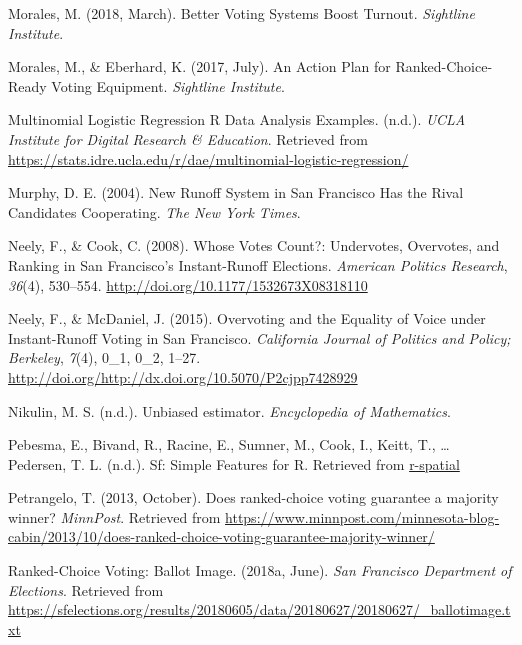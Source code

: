 \documentclass[12pt,twoside]{reedthesis}
\begin{document}
\leavevmode\hypertarget{ref-morales_better_2018}{}%
Morales, M. (2018, March). Better Voting Systems Boost Turnout. \emph{Sightline Institute}.

\leavevmode\hypertarget{ref-morales_action_2017}{}%
Morales, M., \& Eberhard, K. (2017, July). An Action Plan for Ranked-Choice-Ready Voting Equipment. \emph{Sightline Institute}.

\leavevmode\hypertarget{ref-noauthor_multinomial_nodate}{}%
Multinomial Logistic Regression \textbar{} R Data Analysis Examples. (n.d.). \emph{UCLA Institute for Digital Research \& Education}. Retrieved from \url{https://stats.idre.ucla.edu/r/dae/multinomial-logistic-regression/}

\leavevmode\hypertarget{ref-murphy_new_2004}{}%
Murphy, D. E. (2004). New Runoff System in San Francisco Has the Rival Candidates Cooperating. \emph{The New York Times}.

\leavevmode\hypertarget{ref-neely_whose_2008}{}%
Neely, F., \& Cook, C. (2008). Whose Votes Count?: Undervotes, Overvotes, and Ranking in San Francisco's Instant-Runoff Elections. \emph{American Politics Research}, \emph{36}(4), 530--554. \url{http://doi.org/10.1177/1532673X08318110}

\leavevmode\hypertarget{ref-neely_overvoting_2015}{}%
Neely, F., \& McDaniel, J. (2015). Overvoting and the Equality of Voice under Instant-Runoff Voting in San Francisco. \emph{California Journal of Politics and Policy; Berkeley}, \emph{7}(4), 0\_1, 0\_2, 1--27. \url{http://doi.org/http://dx.doi.org/10.5070/P2cjpp7428929}

\leavevmode\hypertarget{ref-nikulin_unbiased_nodate}{}%
Nikulin, M. S. (n.d.). Unbiased estimator. \emph{Encyclopedia of Mathematics}.

\leavevmode\hypertarget{ref-pebesma_sf_nodate}{}%
Pebesma, E., Bivand, R., Racine, E., Sumner, M., Cook, I., Keitt, T., \ldots{} Pedersen, T. L. (n.d.). Sf: Simple Features for R. Retrieved from \url{r-spatial}

\leavevmode\hypertarget{ref-petrangelo_does_2013}{}%
Petrangelo, T. (2013, October). Does ranked-choice voting guarantee a majority winner? \emph{MinnPost}. Retrieved from \url{https://www.minnpost.com/minnesota-blog-cabin/2013/10/does-ranked-choice-voting-guarantee-majority-winner/}

\leavevmode\hypertarget{ref-noauthor_ranked-choice_2018-1}{}%
Ranked-Choice Voting: Ballot Image. (2018a, June). \emph{San Francisco Department of Elections}. Retrieved from \url{https://sfelections.org/results/20180605/data/20180627/20180627/_ballotimage.txt}
\end{document}

